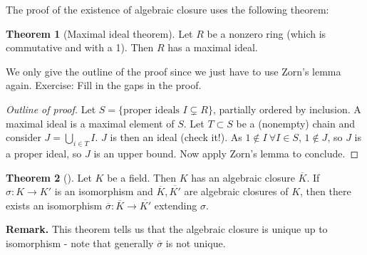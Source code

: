 \documentclass{article}
\theoremstyle{definition}
\newtheorem{theorem}{Theorem}[section]
\begin{document}
The proof of the existence of algebraic closure uses the following theorem:
\begin{theorem}[Maximal ideal theorem]
    Let $R$ be a nonzero ring (which is commutative and with a 1). Then $R$ has a maximal ideal.
\end{theorem}
We only give the outline of the proof since we just have to use Zorn's lemma again. Exercise: Fill in the gaps in the proof.
\begin{proof}[Outline of proof]
    Let $S = \{\text{proper ideals }I \subsetneq R\}$, partially ordered by inclusion. A maximal ideal is a maximal element of $S$. Let $T \subset S$ be a (nonempty) chain and consider $J = \bigcup_{i \in  T} I$. $J$ is then an ideal (check it!). As $1 \not\in I ~\forall I \in S$, $1 \not\in J$, so $J$ is a proper ideal, so $J$ is an upper bound. Now apply Zorn's lemma to conclude.
\end{proof}
\begin{theorem}[]
    Let $K$ be a field. Then $K$ has an algebraic closure $\overline{K}$. If $\sigma: K \to K'$ is an isomorphism and $\overline{K}, \overline{K'}$ are algebraic closures of $K$, then there exists an isomorphism $\overline{\sigma}: \overline{K} \to \overline{K'}$ extending $\sigma$.
\end{theorem}
\textbf{Remark.} This theorem tells us that the algebraic closure is unique up to isomorphism - note that generally $\overline{\sigma}$ is not unique.
\end{document}
